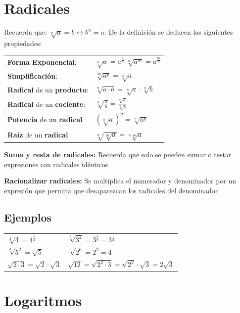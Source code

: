 \documentclass[a4paper,spanish,9pt]{extarticle}
\begin{document}
\begin{multicols*}{2}
\section{Radicales}
Recuerda que: $\sqrt[n]{a}=b \longleftrightarrow b^n=a$. De la definición se deducen las siguientes propiedades:
\vspace{0.3cm}

\begin{tabular}{ll}
\textbf{Forma Exponencial}: & $\sqrt[n]{a}=a^\frac{1}{n} \ \sqrt[n]{a^m}=a^\frac{m}{n} $ \\
\textbf{Simplificación}: & $\sqrt[np]{a^p}=\sqrt[n]{a}$ \\
\textbf{Radical} de un \textbf{producto}: & $\sqrt[n]{a\cdot b}=\sqrt[n]{a}\cdot\sqrt[n]{b}$ \\
\textbf{Radical} de un \textbf{cociente}: & $\sqrt[n]{\frac{a}{b}}=\frac{\sqrt[n]{a}}{\sqrt[n]{b}}$ \\
\textbf{Potencia} de un \textbf{radical} & $\left(\sqrt[n]{a}\right)^p=\sqrt[n]{a^p}$ \\
\textbf{Raíz} de un \textbf{radical} & $\sqrt[n]{\sqrt[m]{a}}=\sqrt[n\cdot m]{a}$ \\
\end{tabular}

\vspace{0.5cm}
\textbf{Suma y resta de radicales:} Recuerda que solo se pueden sumar o restar expresiones con radicales idénticos

\vspace{0.5cm}
\textbf{Racionalizar radicales:} Se multiplica el numerador y denominador por un expresión que permita que desaparezcan los radicales del denominador

\subsection{Ejemplos}
\begin{tabular}{ll}
$\sqrt[2]{4}=4^\frac{1}{2}$ & $\sqrt[6]{3^2}=3^\frac{3}{6}=3^\frac{1}{2}$ \\
$\sqrt[4]{5^2}=\sqrt{5}$ & $\sqrt[3]{2^6}=2^2=4$\\
$\sqrt{2\cdot 3}=\sqrt{2}\cdot\sqrt{3}$ & $\sqrt{12}=\sqrt{2^2\cdot 3}=\sqrt{2^2}\cdot\sqrt{3}=2\sqrt{3}$\\ 
\end{tabular}

\section{Logaritmos}


\end{multicols*}
\end{document}
